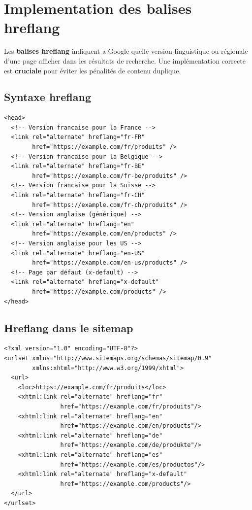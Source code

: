 \documentclass[12pt,a4paper,twoside]{report}
\newcommand{\keyword}[1]{\textbf{\textcolor{googleblue}{#1}}}
\newcommand{\important}[1]{\textbf{\textcolor{googlered}{#1}}}
\begin{document}
\section{Implementation des balises hreflang}

Les \keyword{balises hreflang} indiquent a Google quelle version linguistique ou régionale d'une page afficher dans les résultats de recherche. Une implémentation correcte est \important{cruciale} pour éviter les pénalités de contenu duplique.

\subsection{Syntaxe hreflang}

\begin{lstlisting}[style=htmlcode,caption={Implementation hreflang dans le <head>}]
<head>
  <!-- Version francaise pour la France -->
  <link rel="alternate" hreflang="fr-FR"
        href="https://example.com/fr/produits" />
  <!-- Version francaise pour la Belgique -->
  <link rel="alternate" hreflang="fr-BE"
        href="https://example.com/fr-be/produits" />
  <!-- Version francaise pour la Suisse -->
  <link rel="alternate" hreflang="fr-CH"
        href="https://example.com/fr-ch/produits" />
  <!-- Version anglaise (générique) -->
  <link rel="alternate" hreflang="en"
        href="https://example.com/en/products" />
  <!-- Version anglaise pour les US -->
  <link rel="alternate" hreflang="en-US"
        href="https://example.com/en-us/products" />
  <!-- Page par défaut (x-default) -->
  <link rel="alternate" hreflang="x-default"
        href="https://example.com/products" />
</head>
\end{lstlisting}

\subsection{Hreflang dans le sitemap}

\begin{lstlisting}[style=htmlcode,caption={Declaration hreflang dans le sitemap XML}]
<?xml version="1.0" encoding="UTF-8"?>
<urlset xmlns="http://www.sitemaps.org/schemas/sitemap/0.9"
        xmlns:xhtml="http://www.w3.org/1999/xhtml">
  <url>
    <loc>https://example.com/fr/produits</loc>
    <xhtml:link rel="alternate" hreflang="fr"
                href="https://example.com/fr/produits"/>
    <xhtml:link rel="alternate" hreflang="en"
                href="https://example.com/en/products"/>
    <xhtml:link rel="alternate" hreflang="de"
                href="https://example.com/de/produkte"/>
    <xhtml:link rel="alternate" hreflang="es"
                href="https://example.com/es/productos"/>
    <xhtml:link rel="alternate" hreflang="x-default"
                href="https://example.com/products"/>
  </url>
</urlset>
\end{lstlisting}
\end{document}
